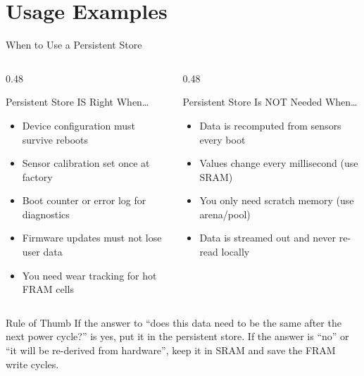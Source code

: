 \documentclass[aspectratio=169, 10pt]{beamer}
\begin{document}
\section{Usage Examples}

\begin{frame}{When to Use a Persistent Store}
\begin{columns}[T]
\begin{column}{0.48\textwidth}
\begin{block}{Persistent Store IS Right When\ldots}
\begin{itemize}
  \item Device configuration must survive reboots
  \item Sensor calibration set once at factory
  \item Boot counter or error log for diagnostics
  \item Firmware updates must not lose user data
  \item You need wear tracking for hot FRAM cells
\end{itemize}
\end{block}
\end{column}

\begin{column}{0.48\textwidth}
\begin{alertblock}{Persistent Store Is NOT Needed When\ldots}
\begin{itemize}
  \item Data is recomputed from sensors every boot
  \item Values change every millisecond (use SRAM)
  \item You only need scratch memory (use arena/pool)
  \item Data is streamed out and never re-read locally
\end{itemize}
\end{alertblock}
\end{column}
\end{columns}

\vspace{0.5em}
\begin{block}{Rule of Thumb}
If the answer to ``does this data need to be the same after the next
power cycle?'' is yes, put it in the persistent store. If the answer
is ``no'' or ``it will be re-derived from hardware'', keep it in SRAM
and save the FRAM write cycles.
\end{block}
\end{frame}
\end{document}
